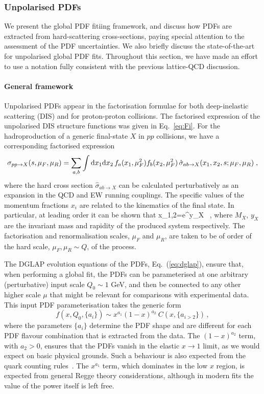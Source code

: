 \subsubsection{Unpolarised PDFs}
\label{sec:unpPDFs}

We present the global PDF fitiing framework, and discuss how PDFs are extracted
from hard-scattering cross-sections, paying special attention
to the assessment of the PDF uncertainties.
%
We also briefly discuss the state-of-the-art for unpolarised
global PDF fits.
%
Throughout this section,
we have made an effort to use a notation fully consistent
with the previous lattice-QCD discussion.

\paragraph{General framework}
%
Unpolarised PDFs appear in the factorisation formulae for both
deep-inelastic scattering (DIS) and for proton-proton collisions.
%
The factorised expression of the unpolarised DIS structure functions 
was given in Eq.~\eqref{eq:Fi}.
%
For the hadroproduction of a generic final-state $X$ in $pp$ collisions, we have
a corresponding factorised expression
\begin{equation}
  \label{eq:LHCxsec}
\sigma_{pp\to X}(s,\mu_F,\mu_R)=\sum_{a,b}\int {\rm d}x_1 {\rm d}x_2\, f_a(x_1,\mu_F^2)f_b(x_2,\mu_F^2)\,\hat{\sigma}_{ab\to X}(x_1,x_2,s;\mu_{F},\mu_R)\;,
\end{equation}
where the hard cross section $\hat{\sigma}_{ab\to X}$ can
be calculated perturbatively as an expansion in the QCD and EW running couplings.
%
The specific values of the momentum fractions
$x_i$ are related to the kinematics of the final state.
%
In particular, at leading order it can be shown that
\be
x_{1,2}=e^{\pm y_X} \, ,
\ee
where $M_X$, $y_X$ are the invariant mass and rapidity of the produced system respectively.
%
The factorisation and renormalisation scales, $\mu_F$ and $\mu_R$, are taken to be of order of the hard scale,
$\mu_F,\mu_R \sim Q$, of the process.

The DGLAP evolution equations of the PDFs, Eq.~(\ref{eq:dglap}), ensure that, 
when performing a global fit, the PDFs can be parameterised at one arbitrary 
(perturbative) input scale $Q_0\sim 1$ GeV, and
then be connected to any other higher scale $\mu$ that might be relevant
for comparisons with experimental data.
%
This input PDF parameterisation takes the generic form
\begin{equation}
\label{eq:pdffunc}
f(x,Q_0,\{a_i\})\sim x^{a_1}(1-x)^{a_2}\:C(x,\{a_{i>2}\})\, ,
\end{equation}
where the parameters $\{a_i\}$ determine the PDF shape
and are different for each PDF flavour combination that
is extracted from the data.
%
The $(1-x)^{a_2}$ term, with $a_{2}>0$, ensures that the PDFs
vanish in the elastic $x\to 1$ limit, as we would expect on basic physical grounds. 
%
Such a behaviour is also expected from the quark
counting rules~\cite{Brodsky:1973kr,Ball:2016spl}.
%
The $x^{a_1}$ term, which dominates in the low $x$
region, is expected from general Regge theory considerations,
although in modern fits the value of the power itself is left free.


